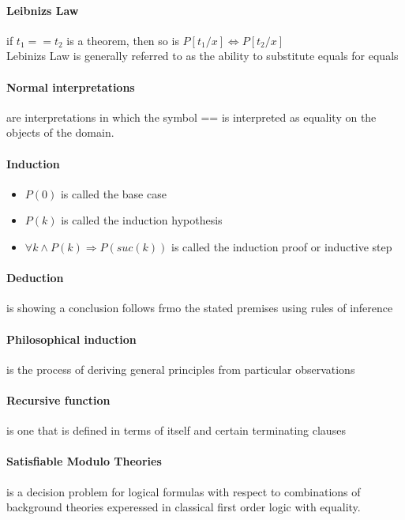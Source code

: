 \documentclass[12pt]{report}
\begin{document}
    \paragraph{Leibnizs Law} if $t_1 == t_2$ is a theorem, then so is $P[ t_1 / x ]
    \Leftrightarrow P[ t_2 / x ]$\\
    Lebinizs Law is generally referred to as the ability to substitute equals
    for equals

    \paragraph{Normal interpretations} are interpretations in which the symbol
    == is interpreted as equality on the objects of the domain.

    \paragraph{Induction}
      \begin{itemize}
        \item $P(0)$ is called the base case
        \item $P(k)$ is called the induction hypothesis
        \item $\forall k \wedge P(k) \Rightarrow P(suc(k))$ is called the
        induction proof or inductive step
      \end{itemize}

    \paragraph{Deduction} is showing a conclusion follows frmo the stated
    premises using rules of inference

    \paragraph{Philosophical induction} is the process of deriving general
    principles from particular observations

    \paragraph{Recursive function} is one that is defined in terms of itself
    and certain terminating clauses

    \paragraph{Satisfiable Modulo Theories}
      is a decision problem for logical formulas with respect to combinations
      of background theories experessed in classical first order logic with
      equality.
\end{document}
